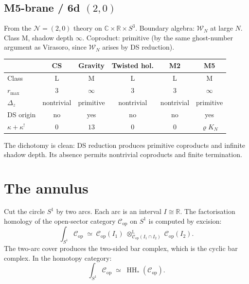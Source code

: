 \documentclass[11pt]{article}
\newcommand{\cC}{\mathcal{C}}
\newcommand{\cN}{\mathcal{N}}
\newcommand{\cW}{\mathcal{W}}
\newcommand{\C}{\mathbb{C}}
\newcommand{\R}{\mathbb{R}}
\newcommand{\HH}{\operatorname{HH}}
\begin{document}
\subsection*{M5-brane / 6d $(2,0)$}

From the $\cN = (2,0)$ theory on $\C \times \R \times S^3$.
Boundary algebra: $\cW_N$ at large $N$.  Class M, shadow depth
$\infty$.  Coproduct: primitive (by the same ghost-number
argument as Virasoro, since $\cW_N$ arises by DS reduction).

\begin{center}
\small
\renewcommand{\arraystretch}{1.15}
\begin{tabular}{@{}lccccc@{}}
 & CS & Gravity & Twisted hol. & M2 & M5 \\
\hline
Class & L & M & L & L & M \\
$r_{\max}$ & $3$ & $\infty$ & $3$ & $3$ & $\infty$ \\
$\Delta_z$ & nontrivial & primitive & nontrivial
  & nontrivial & primitive \\
DS origin & no & yes & no & no & yes \\
$\kappa + \kappa^!$ & $0$ & $13$ & $0$ & $0$ & $\varrho K_N$
\end{tabular}
\end{center}

\medskip

The dichotomy is clean: DS reduction produces primitive
coproducts and infinite shadow depth.  Its absence permits
nontrivial coproducts and finite termination.


\section{The annulus}
\label{sec:annulus}

Cut the circle $S^1$ by two arcs.  Each arc is an interval
$I \cong \R$.  The factorisation homology of the open-sector
category $\cC_{\mathrm{op}}$ on $S^1$ is computed by excision:
\[
\int_{S^1} \cC_{\mathrm{op}}
\;\simeq\;
\cC_{\mathrm{op}}(I_1)
\;\otimes_{\cC_{\mathrm{op}}(I_1 \cap I_2)}^{\mathbb{L}}\;
\cC_{\mathrm{op}}(I_2).
\]
The two-arc cover produces the two-sided bar complex, which is
the cyclic bar complex.  In the homotopy category:
\begin{equation}\label{eq:annulus-trace-wn}
\int_{S^1} \cC_{\mathrm{op}}
\;\simeq\;
\HH_*(\cC_{\mathrm{op}}).
\end{equation}
\end{document}
